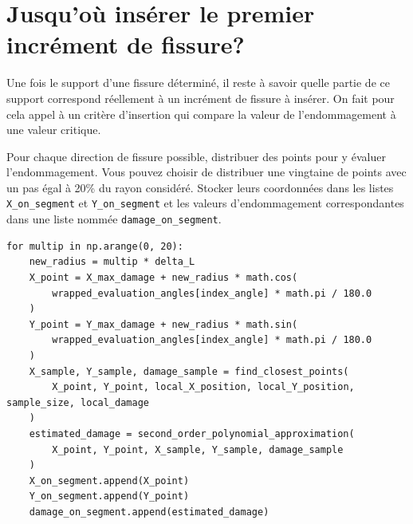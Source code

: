 \documentclass[french,12pt]{exam}
\begin{document}
\section{Jusqu'où insérer le premier incrément de fissure?}

Une fois le support d'une fissure déterminé, il reste à savoir quelle partie de ce support correspond réellement à un incrément de fissure à insérer. On fait pour cela appel à un critère d'insertion qui compare la valeur de l'endommagement à une valeur critique. 

\begin{questions}
\question Pour chaque direction de fissure possible, distribuer des points pour y évaluer l'endommagement. Vous pouvez choisir de distribuer une vingtaine de points avec un pas égal à 20\% du rayon considéré. Stocker leurs coordonnées dans les listes \texttt{X\_on\_segment} et \texttt{Y\_on\_segment} et les valeurs d'endommagement correspondantes dans une liste nommée \texttt{damage\_on\_segment}.

\begin{solution}
\begin{lstlisting}
for multip in np.arange(0, 20):
    new_radius = multip * delta_L
    X_point = X_max_damage + new_radius * math.cos(
        wrapped_evaluation_angles[index_angle] * math.pi / 180.0
    )
    Y_point = Y_max_damage + new_radius * math.sin(
        wrapped_evaluation_angles[index_angle] * math.pi / 180.0
    )
    X_sample, Y_sample, damage_sample = find_closest_points(
        X_point, Y_point, local_X_position, local_Y_position, sample_size, local_damage
    )
    estimated_damage = second_order_polynomial_approximation(
        X_point, Y_point, X_sample, Y_sample, damage_sample
    )
    X_on_segment.append(X_point)
    Y_on_segment.append(Y_point)
    damage_on_segment.append(estimated_damage)
\end{lstlisting}
\end{solution}



\end{questions}
\end{document}
